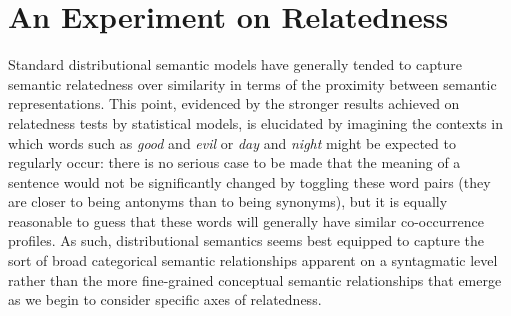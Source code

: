 \section{An Experiment on Relatedness} \label{sec:relperiment}
Standard distributional semantic models have generally tended to capture semantic relatedness over similarity in terms of the proximity between semantic representations.  This point, evidenced by the stronger results achieved on relatedness tests by statistical models, is elucidated by imagining the contexts in which words such as \emph{good} and \emph{evil} or \emph{day} and \emph{night} might be expected to regularly occur: there is no serious case to be made that the meaning of a sentence would not be significantly changed by toggling these word pairs (they are closer to being antonyms than to being synonyms), but it is equally reasonable to guess that these words will generally have similar co-occurrence profiles.  As such, distributional semantics seems best equipped to capture the sort of broad categorical semantic relationships apparent on a syntagmatic level rather than the more fine-grained conceptual semantic relationships that emerge as we begin to consider specific axes of relatedness.

